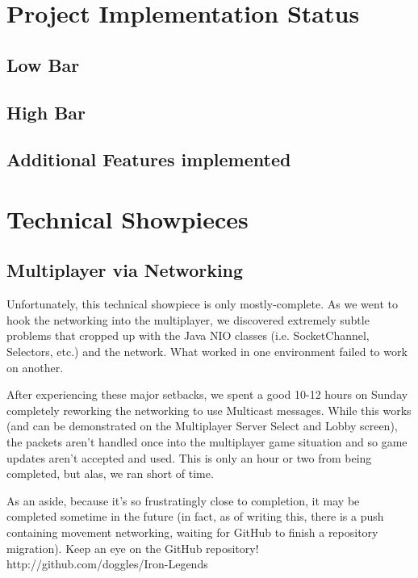\documentclass[letterpaper,11pt,twoside]{article}
\begin{document}
\section{Project Implementation Status}

\subsection{Low Bar}

\subsection{High Bar}

\subsection{Additional Features implemented}

\section{Technical Showpieces}

\subsection{Multiplayer via Networking}

Unfortunately, this technical showpiece is only mostly-complete. As we went to hook the networking into the multiplayer, we discovered extremely subtle problems that cropped up with the Java NIO classes (i.e. SocketChannel, Selectors, etc.) and the network. What worked in one environment failed to work on another.

After experiencing these major setbacks, we spent a good 10-12 hours on Sunday completely reworking the networking to use Multicast messages. While this works (and can be demonstrated on the Multiplayer Server Select and Lobby screen), the packets aren't handled once into the multiplayer game situation and so game updates aren't accepted and used. This is only an hour or two from being completed, but alas, we ran short of time.

As an aside, because it's so frustratingly close to completion, it may be completed sometime in the future (in fact, as of writing this, there is a push containing movement networking, waiting for GitHub to finish a repository migration). Keep an eye on the GitHub repository! http://github.com/doggles/Iron-Legends
\end{document}
